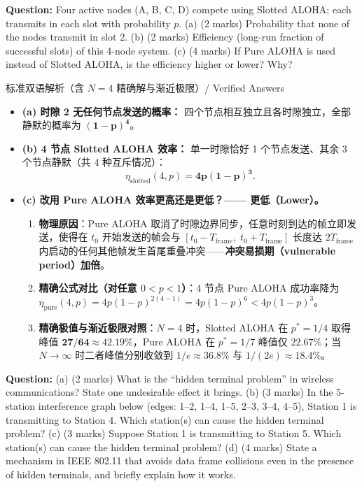 
\textbf{Question:} Four active nodes (A, B, C, D) compete using Slotted ALOHA; each transmits in each slot with probability $p$.
(a) (2 marks) Probability that none of the nodes transmit in slot 2.
(b) (2 marks) Efficiency (long-run fraction of successful slots) of this 4-node system.
(c) (4 marks) If Pure ALOHA is used instead of Slotted ALOHA, is the efficiency higher or lower? Why?

\begin{StudySolution}{标准双语解析（含 $N=4$ 精确解与渐近极限）/ Verified Answers}
\begin{itemize}
\item \textbf{(a) 时隙 2 无任何节点发送的概率：} 四个节点相互独立且各时隙独立，全部静默的概率为 $\mathbf{(1-p)^4}$。
\item \textbf{(b) 4 节点 Slotted ALOHA 效率：} 单一时隙恰好 1 个节点发送、其余 3 个节点静默（共 4 种互斥情况）：
  \[
  \eta_{\text{slotted}}(4, p) = \mathbf{4p(1-p)^3}. \tag{F.6}
  \]
\item \textbf{(c) 改用 Pure ALOHA 效率更高还是更低？—— 更低（Lower）。}
  \begin{enumerate}
  \item \textbf{物理原因}：Pure ALOHA 取消了时隙边界同步，任意时刻到达的帧立即发送，使得在 $t_0$ 开始发送的帧会与 $[t_0 - T_{\text{frame}},\; t_0 + T_{\text{frame}}]$ 长度达 \textbf{$2T_{\text{frame}}$} 内启动的任何其他帧发生首尾重叠冲突——\textbf{冲突易损期（vulnerable period）加倍}。
  \item \textbf{精确公式对比（对任意 $0<p<1$）}：4 节点 Pure ALOHA 成功率降为 $\eta_{\text{pure}}(4,p) = 4p(1-p)^{2(4-1)} = 4p(1-p)^6 < 4p(1-p)^3$。
  \item \textbf{精确极值与渐近极限对照}：$N=4$ 时，Slotted ALOHA 在 $p^*=1/4$ 取得峰值 $\mathbf{27/64 \approx 42.19\%}$，Pure ALOHA 在 $p^*=1/7$ 峰值仅 $\mathbf{22.67\%}$；当 $N\to\infty$ 时二者峰值分别收敛到 $1/e \approx 36.8\%$ 与 $1/(2e) \approx 18.4\%$。
  \end{enumerate}
\end{itemize}
\end{StudySolution}



\textbf{Question:}
(a) (2 marks) What is the ``hidden terminal problem'' in wireless communications? State one undesirable effect it brings.
(b) (3 marks) In the 5-station interference graph below (edges: 1--2, 1--4, 1--5, 2--3, 3--4, 4--5), Station 1 is transmitting to Station 4. Which station(s) can cause the hidden terminal problem?
(c) (3 marks) Suppose Station 1 is transmitting to Station 5. Which station(s) can cause the hidden terminal problem?
(d) (4 marks) State a mechanism in IEEE 802.11 that avoids data frame collisions even in the presence of hidden terminals, and briefly explain how it works.

